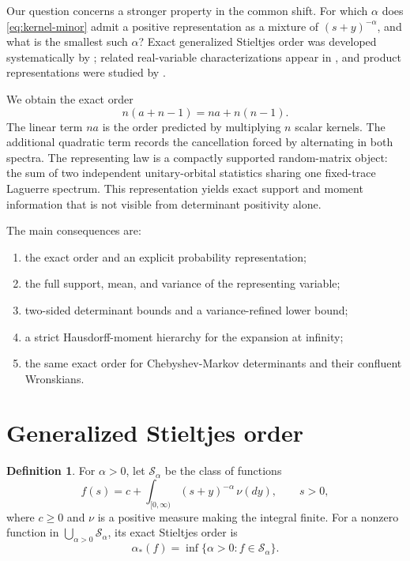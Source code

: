 \documentclass[11pt]{article}
\theoremstyle{definition}
\newtheorem{definition}[theorem]{Definition}
\theoremstyle{remark}
\newcommand{\cS}{\mathcal{S}}
\begin{document}
Our question concerns a stronger property in the common shift. For which
$\alpha$ does \eqref{eq:kernel-minor} admit a positive representation as a
mixture of $(s+y)^{-\alpha}$, and what is the smallest such $\alpha$? Exact
generalized Stieltjes order was developed systematically by
\citet{KarpPrilepkina2012}; related real-variable characterizations appear in
\citet{Sokal2010,KoumandosPedersen2018}, and product representations were
studied by \citet{GomilkoTomilov2024}.

We obtain the exact order
\[
n(a+n-1)=na+n(n-1).
\]
The linear term $na$ is the order predicted by multiplying $n$ scalar kernels.
The additional quadratic term records the cancellation forced by alternating
in both spectra. The representing law is a compactly supported random-matrix
object: the sum of two independent unitary-orbital statistics sharing one
fixed-trace Laguerre spectrum. This representation yields exact support and
moment information that is not visible from determinant positivity alone.

The main consequences are:
\begin{enumerate}[leftmargin=2em]
  \item the exact order and an explicit probability representation;
  \item the full support, mean, and variance of the representing variable;
  \item two-sided determinant bounds and a variance-refined lower bound;
  \item a strict Hausdorff-moment hierarchy for the expansion at infinity;
  \item the same exact order for Chebyshev-Markov determinants and their
  confluent Wronskians.
\end{enumerate}

\section{Generalized Stieltjes order}

\begin{definition}
For $\alpha>0$, let $\cS_\alpha$ be the class of functions
\begin{equation}\label{eq:stieltjes-class}
f(s)=c+\int_{[0,\infty)}(s+y)^{-\alpha}\,\nu(dy),\qquad s>0,
\end{equation}
where $c\ge0$ and $\nu$ is a positive measure making the integral finite. For
a nonzero function in $\bigcup_{\alpha>0}\cS_\alpha$, its exact Stieltjes
order is
\[
\alpha_*(f)=\inf\{\alpha>0:f\in\cS_\alpha\}.
\]
\end{definition}
\end{document}
